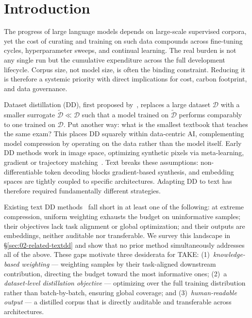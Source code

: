 \section{Introduction} \label{sec:01-introduction}
\begin{foldable} %
  The progress of large language models depends on large-scale supervised corpora, yet the cost of curating and training on such data compounds across fine-tuning cycles, hyperparameter sweeps, and continual learning.
  The real burden is not any single run but the cumulative expenditure across the full development lifecycle.
  Corpus size, not model size, is often the binding constraint.
  Reducing it is therefore a systemic priority with direct implications for cost, carbon footprint, and data governance.
\end{foldable}

\begin{foldable} %
  Dataset distillation (DD), first proposed by~\cite{wang2018dataset}, replaces a large dataset $\mathcal{D}$ with a smaller surrogate $\tilde{\mathcal{D}} \ll \mathcal{D}$ such that a model trained on $\tilde{\mathcal{D}}$ performs comparably to one trained on $\mathcal{D}$.
  Put another way: what is the smallest textbook that teaches the same exam?
  This places DD squarely within data-centric AI, complementing model compression by operating on the data rather than the model itself.
  Early DD methods work in image space, optimizing synthetic pixels via meta-learning, gradient or trajectory matching~\cite{wang2018dataset,zhao2020dataset,cazenavette2022dataset}.
  Text breaks these assumptions: non-differentiable token decoding blocks gradient-based synthesis, and embedding spaces are tightly coupled to specific architectures.
  Adapting DD to text has therefore required fundamentally different strategies.
\end{foldable}

\begin{foldable} %
  Existing text DD methods~\cite{sucholutsky2021soft,li2021data,maekawa2023dataset,maekawa2024dilm,tao2024textual} fall short in at least one of the following: at extreme compression, uniform weighting exhausts the budget on uninformative samples; their objectives lack task alignment or global optimization; and their outputs are embeddings, neither auditable nor transferable.
  We survey this landscape in \S\ref{sec:02-related-textdd} and show that no prior method simultaneously addresses all of the above.
  These gaps motivate three desiderata for TAKE:{
    (1)~\emph{knowledge-based weighting} --- weighting samples by their task-aligned downstream contribution, directing the budget toward the most informative ones;
    (2)~a \emph{dataset-level distillation objective} --- optimizing over the full training distribution rather than batch-by-batch, ensuring global coverage;
    and (3)~\emph{human-readable output} --- a distilled corpus that is directly auditable and transferable across architectures.
  }
\end{foldable}

